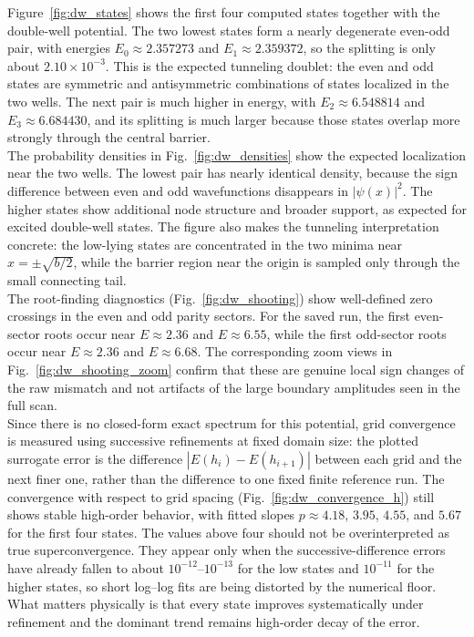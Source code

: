 \documentclass[11pt]{article}
\begin{document}
\begin{refsection}
            Figure~\ref{fig:dw_states} shows the first four computed states together with the double-well potential. The two lowest states form a nearly degenerate even-odd pair, with energies $E_0\approx2.357273$ and $E_1\approx2.359372$, so the splitting is only about $2.10\times10^{-3}$. This is the expected tunneling doublet: the even and odd states are symmetric and antisymmetric combinations of states localized in the two wells. The next pair is much higher in energy, with $E_2\approx6.548814$ and $E_3\approx6.684430$, and its splitting is much larger because those states overlap more strongly through the central barrier. \\

            The probability densities in Fig.~\ref{fig:dw_densities} show the expected localization near the two wells. The lowest pair has nearly identical density, because the sign difference between even and odd wavefunctions disappears in $|\psi(x)|^2$. The higher states show additional node structure and broader support, as expected for excited double-well states. The figure also makes the tunneling interpretation concrete: the low-lying states are concentrated in the two minima near $x=\pm\sqrt{b/2}$, while the barrier region near the origin is sampled only through the small connecting tail. \\

            The root-finding diagnostics (Fig.~\ref{fig:dw_shooting}) show well-defined zero crossings in the even and odd parity sectors. For the saved run, the first even-sector roots occur near $E\approx2.36$ and $E\approx6.55$, while the first odd-sector roots occur near $E\approx2.36$ and $E\approx6.68$. The corresponding zoom views in Fig.~\ref{fig:dw_shooting_zoom} confirm that these are genuine local sign changes of the raw mismatch and not artifacts of the large boundary amplitudes seen in the full scan. \\

            Since there is no closed-form exact spectrum for this potential, grid convergence is measured using successive refinements at fixed domain size: the plotted surrogate error is the difference $|E(h_i)-E(h_{i+1})|$ between each grid and the next finer one, rather than the difference to one fixed finite reference run. The convergence with respect to grid spacing (Fig.~\ref{fig:dw_convergence_h}) still shows stable high-order behavior, with fitted slopes $p\approx4.18$, $3.95$, $4.55$, and $5.67$ for the first four states. The values above four should not be overinterpreted as true superconvergence. They appear only when the successive-difference errors have already fallen to about $10^{-12}$--$10^{-13}$ for the low states and $10^{-11}$ for the higher states, so short log--log fits are being distorted by the numerical floor. What matters physically is that every state improves systematically under refinement and the dominant trend remains high-order decay of the error. \\


\end{refsection}
\end{document}
